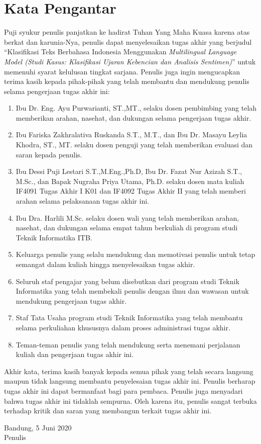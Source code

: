\chapter*{Kata Pengantar}

Puji syukur penulis panjatkan ke hadirat Tuhan Yang Maha Kuasa karena atas berkat dan karunia-Nya, penulis dapat menyelesaikan tugas akhir yang berjudul “Klasifikasi Teks Berbahasa Indonesia Menggunakan \textit{Multilingual Language Model (Studi Kasus: Klasifikasi Ujaran Kebencian dan Analisis Sentimen)}” untuk memenuhi syarat kelulusan tingkat sarjana. Penulis juga ingin mengucapkan terima kasih kepada pihak-pihak yang telah membantu dan mendukung penulis selama pengerjaan tugas akhir ini:

\begin{enumerate}
    \item Ibu Dr. Eng. Ayu Purwarianti, ST.,MT., selaku dosen pembimbing yang telah memberikan arahan, nasehat, dan dukungan selama pengerjaan tugas akhir.
    \item Ibu Fariska Zakhralativa Ruskanda S.T., M.T., dan Ibu Dr. Masayu Leylia Khodra, ST., MT. selaku dosen penguji yang telah memberikan evaluasi dan saran kepada penulis.
    \item Ibu Dessi Puji Lestari S.T.,M.Eng.,Ph.D, Ibu Dr. Fazat Nur Azizah S.T., M.Sc., dan Bapak Nugraha Priya Utama, Ph.D. selaku dosen mata kuliah IF4091 Tugas Akhir I K01 dan IF4092 Tugas Akhir II yang telah memberi arahan selama pelaksanaan tugas akhir ini.
    \item Ibu Dra. Harlili M.Sc. selaku dosen wali yang telah memberikan arahan, nasehat, dan dukungan selama empat tahun berkuliah di program studi Teknik Informatika ITB.
    \item Keluarga penulis yang selalu mendukung dan memotivasi penulis untuk tetap semangat dalam kuliah hingga menyelesaikan tugas akhir.
    \item Seluruh staf pengajar yang belum disebutkan dari program studi Teknik Informatika yang telah membekali penulis dengan ilmu dan wawasan untuk mendukung pengerjaan tugas akhir.
    \item Staf Tata Usaha program studi Teknik Informatika yang telah membantu selama perkuliahan khususnya dalam proses administrasi tugas akhir.
    \item Teman-teman penulis yang telah mendukung serta menemani perjalanan kuliah dan pengerjaan tugas akhir ini.

    
\end{enumerate}
Akhir kata, terima kasih banyak kepada semua pihak yang telah secara langsung maupun tidak langsung membantu penyelesaian tugas akhir ini. Penulis berharap tugas akhir ini dapat bermanfaat bagi para pembaca. Penulis juga menyadari bahwa tugas akhir ini tidaklah sempurna. Oleh karena itu, penulis sangat terbuka terhadap kritik dan saran yang membangun terkait tugas akhir ini.

\begin{flushright} 
    Bandung, 5 Juni 2020 \\
    \vfill
    Penulis
\end{flushright}
\clearpage
